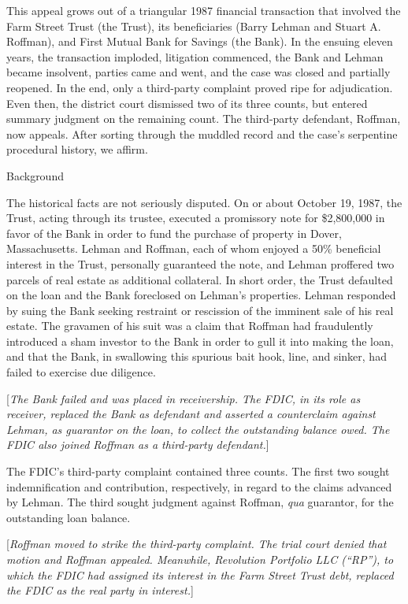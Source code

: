 \documentclass[11pt,letterpaper,twoside]{article}
\begin{document}
This appeal grows out of a triangular 1987 financial transaction that
involved the Farm Street Trust (the Trust), its beneficiaries (Barry
Lehman and Stuart A. Roffman), and First Mutual Bank for Savings (the
Bank). In the ensuing eleven years, the transaction imploded, litigation
commenced, the Bank and Lehman became insolvent, parties came and went,
and the case was closed and partially reopened. In the end, only a
third-party complaint proved ripe for adjudication. Even then, the
district court dismissed two of its three counts, but entered summary
judgment on the remaining count. The third-party defendant, Roffman, now
appeals. After sorting through the muddled record and the case's
serpentine procedural history, we affirm.

{Background}

The historical facts are not seriously disputed. On or about October 19,
1987, the Trust, acting through its trustee, executed a promissory note
for \$2,800,000 in favor of the Bank in order to fund the purchase of
property in Dover, Massachusetts. Lehman and Roffman, each of whom
enjoyed a 50\% beneficial interest in the Trust, personally guaranteed
the note, and Lehman proffered two parcels of real estate as additional
collateral. In short order, the Trust defaulted on the loan and the Bank
foreclosed on Lehman's properties. Lehman responded by suing the Bank
seeking restraint or rescission of the imminent sale of his real estate.
The gravamen of his suit was a claim that Roffman had fraudulently
introduced a sham investor to the Bank in order to gull it into making
the loan, and that the Bank, in swallowing this spurious bait hook,
line, and sinker, had failed to exercise due diligence.

{[}\emph{The Bank failed and was placed in receivership. The FDIC, in
its role as receiver, replaced the Bank as defendant and asserted a
counterclaim against Lehman, as guarantor on the loan, to collect the
outstanding balance owed. The FDIC also joined Roffman as a third-party
defendant.}{]}

The FDIC's third-party complaint contained three counts. The first two
sought indemnification and contribution, respectively, in regard to the
claims advanced by Lehman. The third sought judgment against Roffman,
\emph{qua} guarantor, for the outstanding loan balance.

{[}\emph{Roffman moved to strike the third-party complaint. The trial
court denied that motion and Roffman appealed. Meanwhile, Revolution
Portfolio LLC (``RP''), to which the FDIC had assigned its interest in
the Farm Street Trust debt, replaced the FDIC as the real party in
interest.}{]}
\end{document}
